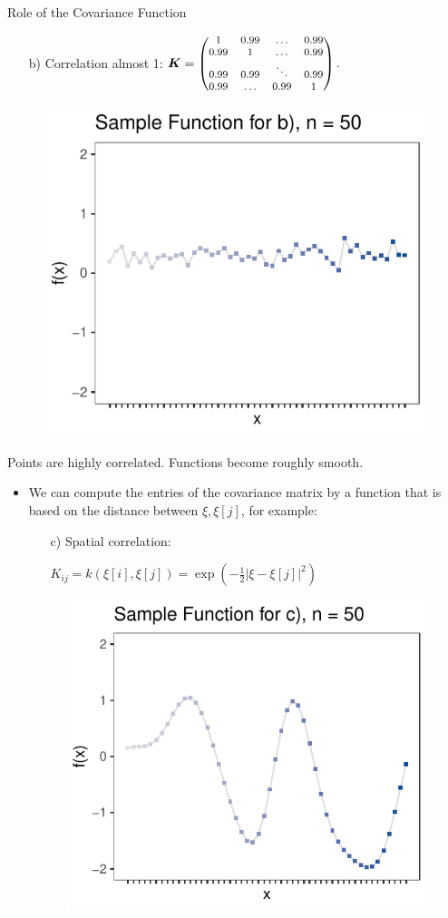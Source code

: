 \documentclass[11pt,compress,t,notes=noshow, xcolor=table]{beamer}
\begin{document}
\begin{vbframe}{Role of the Covariance Function}

\begin{enumerate}
  \item[b)] Correlation almost 1: $\bm{K} = \begin{footnotesize}\begin{pmatrix} 1 & 0.99 & \dots & 0.99 \\
  0.99 & 1 & \dots & 0.99 \\
  0.99 & 0.99 & \ddots & 0.99 \\
  0.99 & \dots & 0.99 & 1 \end{pmatrix}.\end{footnotesize}$
  \vspace{10pt}
\end{enumerate}

\begin{figure}\includegraphics[width=0.45\linewidth]{figure/discrete/example_extreme_50_2.pdf}
\end{figure}

Points are highly correlated. Functions become roughly smooth.

\framebreak

\begin{itemize}
  \item We can compute the entries of the covariance matrix by a function that is based on the distance between $\xi, \xi[j]$, for example:

  \vspace*{0.2cm}
  \begin{enumerate}
    \item[c)] Spatial correlation: \begin{footnotesize}$K_{ij} = k(\xi[i], \xi[j]) = \exp\left(-\frac{1}{2}\left|\xi - \xi[j]\right|^2\right)$\end{footnotesize}
  \end{enumerate}

\begin{figure}
\includegraphics[width=0.45\linewidth]{figure/discrete/example_extreme_50_3.pdf}
\end{figure}


\end{itemize}
\end{vbframe}
\end{document}
